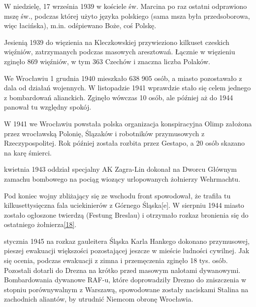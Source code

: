 \documentclass{article}
\begin{document}
\noindent W niedzielę, 17 września 1939 w kościele św. Marcina po raz ostatni odprawiono mszę św., podczas której użyto języka polskiego (sama msza była przedsoborowa, więc łacińska), m.in. odśpiewano Boże, coś Polskę.

\vspace{6pt}

\noindent Jesienią 1939 do więzienia na Kleczkowskiej przywieziono kilkuset czeskich więźniów, zatrzymanych podczas masowych aresztowań. Łącznie w więzieniu zginęło 869 więźniów, w tym 363 Czechów i znaczna liczba Polaków.

\vspace{6pt}

\noindent We Wrocławiu 1 grudnia 1940 mieszkało 638 905 osób, a miasto pozostawało z dala od działań wojennych. W listopadzie 1941 wprawdzie stało się celem jednego z bombardowań alianckich. Zginęło wówczas 10 osób, ale później aż do 1944 panował tu względny spokój.

\vspace{6pt}

\noindent W 1941 we Wrocławiu powstała polska organizacja konspiracyjna Olimp założona przez wrocławską Polonię, Ślązaków i robotników przymusowych z Rzeczypospolitej. Rok później została rozbita przez Gestapo, a 20 osób skazano na karę śmierci.

\vspace{6pt}

 kwietnia 1943 oddział specjalny AK Zagra-Lin dokonał na Dworcu Głównym zamachu bombowego na pociąg wiozący urlopowanych żołnierzy Wehrmachtu.

\vspace{6pt}

\noindent Pod koniec wojny zbliżający się ze wschodu front spowodował, że trafiła tu kilkusettysięczna fala uciekinierów z Górnego Śląska[e]. W sierpniu 1944 miasto zostało ogłoszone twierdzą (Festung Breslau) i otrzymało rozkaz bronienia się do ostatniego żołnierza\hyperref[18]{[18]}\label{118}.

\vspace{6pt}

 stycznia 1945 na rozkaz gauleitera Śląska Karla Hankego dokonano przymusowej, pieszej ewakuacji większości pozostającej jeszcze w mieście ludności cywilnej. Jak się ocenia, podczas ewakuacji z zimna i przemęczenia zginęło 18 tys. osób. Pozostali dotarli do Drezna na krótko przed masowym nalotami dywanowymi. Bombardowania dywanowe RAF-u, które doprowadziły Drezno do zniszczenia w stopniu porównywalnym z Warszawą, spowodowane zostały naciskami Stalina na zachodnich aliantów, by utrudnić Niemcom obronę Wrocławia.
\end{document}
